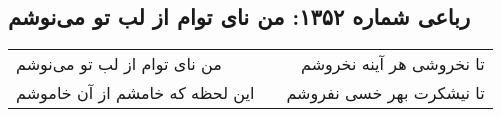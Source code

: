 \begin{center}
\section*{رباعی شماره ۱۳۵۲: من نای توام از لب تو می‌نوشم}
\label{sec:1352}
\begin{longtable}{l p{0.5cm} r}
من نای توام از لب تو می‌نوشم
&&
تا نخروشی هر آینه نخروشم
\\
این لحظه که خامشم از آن خاموشم
&&
تا نیشکرت بهر خسی نفروشم
\\
\end{longtable}
\end{center}
